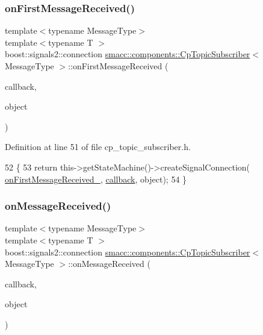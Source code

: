 \subsubsection{\texorpdfstring{on\+First\+Message\+Received()}{onFirstMessageReceived()}}
{\footnotesize\ttfamily template$<$typename Message\+Type$>$ \\
template$<$typename T $>$ \\
boost\+::signals2\+::connection \hyperlink{classsmacc_1_1components_1_1CpTopicSubscriber}{smacc\+::components\+::\+Cp\+Topic\+Subscriber}$<$ Message\+Type $>$\+::on\+First\+Message\+Received (\begin{DoxyParamCaption}\item[{void(T\+::$\ast$)(const Message\+Type \&)}]{callback,  }\item[{T $\ast$}]{object }\end{DoxyParamCaption})\hspace{0.3cm}{\ttfamily [inline]}}



Definition at line 51 of file cp\+\_\+topic\+\_\+subscriber.\+h.


\begin{DoxyCode}
52     \{
53         \textcolor{keywordflow}{return} this->getStateMachine()->createSignalConnection(
      \hyperlink{classsmacc_1_1components_1_1CpTopicSubscriber_ab8e319857951489298faefa4882e49cc}{onFirstMessageReceived\_}, \hyperlink{servers_2opencv__perception__node_2opencv__perception__node_8cpp_a050e697bd654facce10ea3f6549669b3}{callback}, \textcolor{keywordtype}{object});
54     \}
\end{DoxyCode}
\mbox{\label{classsmacc_1_1components_1_1CpTopicSubscriber_af8f626a4ef4aa6ff699359f136372292}} 
\subsubsection{\texorpdfstring{on\+Message\+Received()}{onMessageReceived()}}
{\footnotesize\ttfamily template$<$typename Message\+Type$>$ \\
template$<$typename T $>$ \\
boost\+::signals2\+::connection \hyperlink{classsmacc_1_1components_1_1CpTopicSubscriber}{smacc\+::components\+::\+Cp\+Topic\+Subscriber}$<$ Message\+Type $>$\+::on\+Message\+Received (\begin{DoxyParamCaption}\item[{void(T\+::$\ast$)(const Message\+Type \&)}]{callback,  }\item[{T $\ast$}]{object }\end{DoxyParamCaption})\hspace{0.3cm}{\ttfamily [inline]}}



